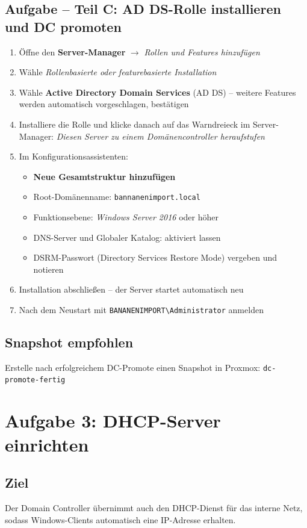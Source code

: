 \documentclass[11pt, oneside, numbers=noenddot]{scrbook}
\begin{document}
\subsection*{Aufgabe -- Teil C: AD DS-Rolle installieren und DC promoten}
\begin{enumerate}
  \item Öffne den \textbf{Server-Manager} $\rightarrow$ \textit{Rollen und Features hinzufügen}
  \item Wähle \textit{Rollenbasierte oder featurebasierte Installation}
  \item Wähle \textbf{Active Directory Domain Services} (AD DS) -- weitere Features werden automatisch vorgeschlagen, bestätigen
  \item Installiere die Rolle und klicke danach auf das Warndreieck im Server-Manager: \textit{Diesen Server zu einem Domänencontroller heraufstufen}
  \item Im Konfigurationsassistenten:
  \begin{itemize}
    \item \textbf{Neue Gesamtstruktur hinzufügen}
    \item Root-Domänenname: \texttt{bannanenimport.local}
    \item Funktionsebene: \textit{Windows Server 2016} oder höher
    \item DNS-Server und Globaler Katalog: aktiviert lassen
    \item DSRM-Passwort (Directory Services Restore Mode) vergeben und notieren
  \end{itemize}
  \item Installation abschließen -- der Server startet automatisch neu
  \item Nach dem Neustart mit \texttt{BANANENIMPORT\textbackslash Administrator} anmelden
\end{enumerate}

\subsection*{Snapshot empfohlen}
Erstelle nach erfolgreichem DC-Promote einen Snapshot in Proxmox: \texttt{dc-promote-fertig}

\newpage

\section{Aufgabe 3: DHCP-Server einrichten}

\subsection*{Ziel}
Der Domain Controller übernimmt auch den DHCP-Dienst für das interne Netz, sodass Windows-Clients automatisch eine IP-Adresse erhalten.
\end{document}
